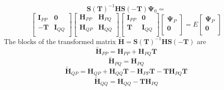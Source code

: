 \begin{equation}
\mathbf{S}(\mathbf{T})^{-1} \mathbf{H} \mathbf{S}(-\mathbf{T})\boldsymbol{\Psi}_{0} = 
\end{equation}
\begin{equation}
\begin{bmatrix}
\mathbf{I}_{PP} & \mathbf{0} \\ 
-\mathbf{T} & \mathbf{I}_{QQ} \\ 
\end{bmatrix}
\begin{bmatrix}
 \mathbf{H}_{PP} & \mathbf{H}_{PQ} \\ 
 \mathbf{H}_{QP} & \mathbf{H}_{QQ} \\ 
\end{bmatrix} 
\begin{bmatrix}
\mathbf{I}_{PP} & \mathbf{0} \\ 
\mathbf{T} & \mathbf{I}_{QQ} \\ 
\end{bmatrix}
\begin{bmatrix}
 \boldsymbol{\Psi}_{P} \\ 
 \mathbf{0}\\ 
\end{bmatrix} 
= E 
\begin{bmatrix}
 \boldsymbol{\Psi}_{P} \\ 
 \mathbf{0}\\ 
\end{bmatrix} 
\label{eqn:TransEvalEqn}
\end{equation}
The blocks of the transformed matrix $\mathbf{\tilde{H}} = \mathbf{S}(\mathbf{T})^{-1} \mathbf{H} \mathbf{S}(-\mathbf{T})$ are
\begin{equation}
\mathbf{\tilde{H}}_{PP} = \mathbf{H}_{PP} + \mathbf{H}_{PQ}\mathbf{T}
\label{eqn:HPP}
\end{equation} 
\begin{equation}
\mathbf{\tilde{H}}_{PQ} = \mathbf{H}_{PQ}
\end{equation} 
\begin{equation}
\mathbf{\tilde{H}}_{QP} = \mathbf{H}_{QP} + \mathbf{H}_{QQ}\mathbf{T} - \mathbf{\mathbf{H}}_{PP}\mathbf{T} - \mathbf{T}\mathbf{H}_{PQ}\mathbf{T}
\label{eqn:HQP}
\end{equation} 
\begin{equation}
\mathbf{\tilde{H}}_{QQ} = \mathbf{H}_{QQ} -\mathbf{T}\mathbf{H}_{PQ}
\end{equation} 

